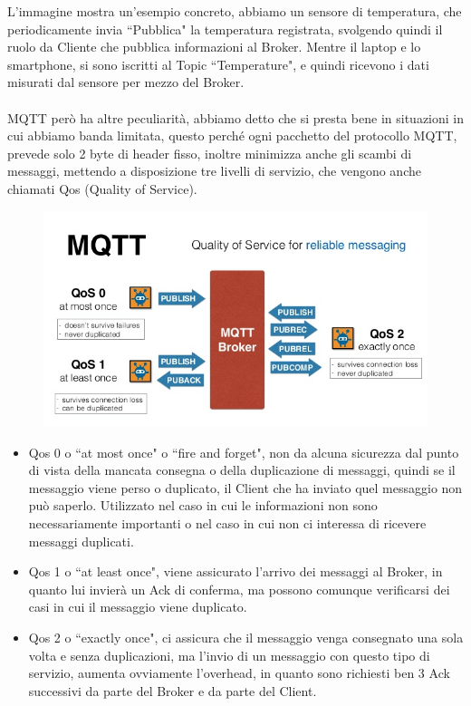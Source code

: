 \documentclass{article}
\begin{document}
L'immagine mostra un'esempio concreto, abbiamo un sensore di temperatura, che periodicamente invia ``Pubblica" la temperatura registrata, svolgendo quindi il ruolo da Cliente che pubblica informazioni al Broker. Mentre il laptop e lo smartphone, si sono iscritti al Topic ``Temperature", e quindi ricevono i dati misurati dal sensore per mezzo del Broker.\\\\
MQTT però ha altre peculiarità, abbiamo detto che si presta bene in situazioni in cui abbiamo banda limitata, questo perché ogni pacchetto del protocollo MQTT, prevede solo 2 byte di header fisso, inoltre minimizza anche gli scambi di messaggi, mettendo a disposizione tre livelli di servizio, che vengono anche chiamati Qos (Quality of Service).

\begin{figure}[htbp]
	\centerline{
		\includegraphics[scale=0.4]{immagini/mqtt_qos.jpg}
	}
\end{figure}

\begin{itemize}
	\item Qos 0 o ``at most once" o ``fire and forget", non da alcuna sicurezza dal punto di vista della mancata consegna o della duplicazione di messaggi, quindi se il messaggio viene perso o duplicato, il Client che ha inviato quel messaggio non può saperlo. Utilizzato nel caso in cui le informazioni non sono necessariamente importanti o nel caso in cui non ci interessa di ricevere messaggi duplicati.
	\item Qos 1 o ``at least once", viene assicurato l'arrivo dei messaggi al Broker, in quanto lui invierà un Ack di conferma, ma possono comunque verificarsi dei casi in cui il messaggio viene duplicato.
	\item Qos 2 o ``exactly once", ci assicura che il messaggio venga consegnato una sola volta e senza duplicazioni, ma l'invio di un messaggio con questo tipo di servizio, aumenta ovviamente l'overhead, in quanto sono richiesti ben 3 Ack successivi da parte del Broker e da parte del Client.
\end{itemize}
\end{document}
